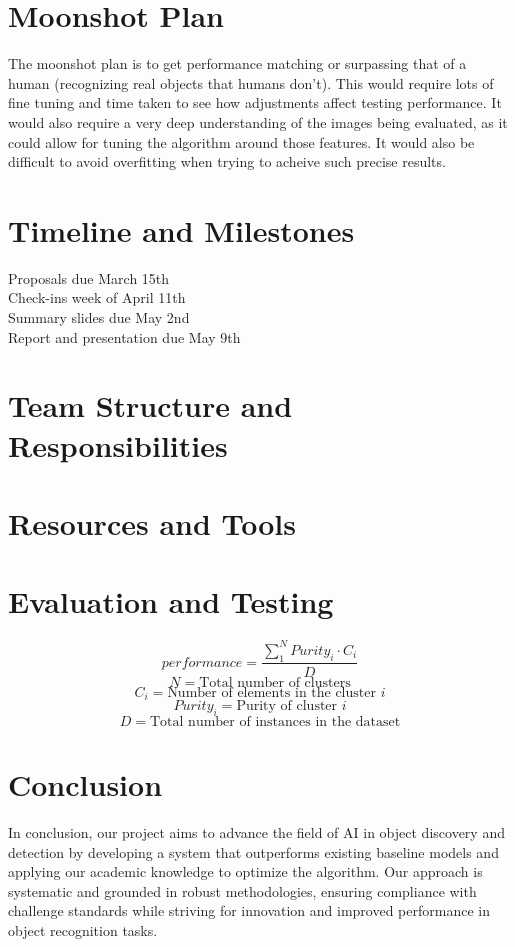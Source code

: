 \documentclass{article}
\begin{document}
	\section{Moonshot Plan}
    The moonshot plan is to get performance matching or surpassing that of a human (recognizing real objects that humans don't). This would require lots of fine tuning and time taken to see how adjustments affect testing performance. It would also require a very deep understanding of the images being evaluated, as it could allow for tuning the algorithm around those features.  It would also be difficult to avoid overfitting when trying to acheive such precise results.
	\section{Timeline and Milestones}
	Proposals due March 15th\\
	Check-ins week of April 11th\\
	Summary slides due May 2nd\\
	Report and presentation due May 9th\\
	
	\section{Team Structure and Responsibilities}
	
	\section{Resources and Tools}
	
	\section{Evaluation and Testing}
	$$performance = \frac{\sum_{1}^{N}Purity_{i} \cdot C_{i}}{D}$$
	$$N = \textrm{Total number of clusters}$$
	$$C_{i} = \textrm{Number of elements in the cluster } i$$
	$$Purity_{i} = \textrm{Purity of cluster } i$$
	$$D = \textrm{Total number of instances in the dataset}$$
	
	\section{Conclusion}
	In conclusion, our project aims to advance the field of AI in object discovery and detection by developing a system that outperforms existing baseline models and applying our academic knowledge to optimize the algorithm. Our approach is systematic and grounded in robust methodologies, ensuring compliance with challenge standards while striving for innovation and improved performance in object recognition tasks.
	
\end{document}
